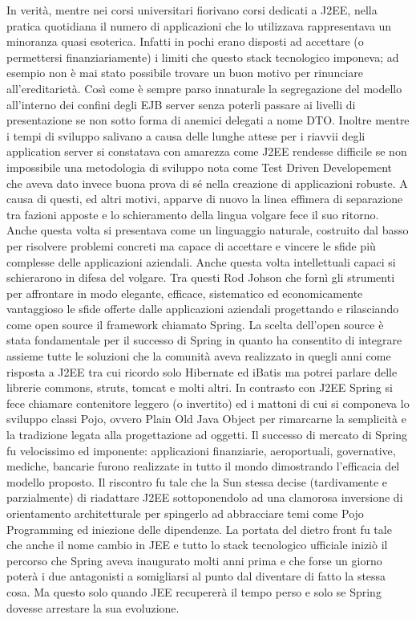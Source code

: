 In verità, mentre nei corsi universitari fiorivano corsi dedicati a J2EE,  nella pratica quotidiana il numero di applicazioni che lo utilizzava rappresentava un minoranza quasi esoterica. Infatti in pochi erano disposti ad accettare (o permettersi finanziariamente) i limiti che questo stack tecnologico imponeva; ad esempio non è mai stato possibile trovare un buon motivo per rinunciare all'ereditarietà. Così come è sempre parso innaturale la segregazione del modello all'interno dei confini degli EJB server senza poterli passare ai livelli di presentazione se non sotto forma di anemici delegati a nome DTO. Inoltre mentre i tempi di sviluppo salivano a causa delle lunghe attese per i riavvii degli application server si constatava con amarezza come J2EE rendesse difficile se non impossibile una metodologia di sviluppo nota come Test Driven Developement che aveva dato invece buona prova di sé nella creazione di applicazioni robuste.
A causa di questi, ed altri motivi, apparve di nuovo la linea effimera di separazione tra fazioni apposte e lo schieramento della lingua volgare fece il suo ritorno. Anche questa volta si presentava come un linguaggio naturale, costruito dal basso per risolvere problemi concreti ma capace di accettare e vincere le sfide più complesse delle applicazioni aziendali. Anche questa volta intellettuali capaci si schierarono in difesa del volgare. Tra questi Rod Johson che fornì gli strumenti per affrontare in modo elegante, efficace, sistematico ed economicamente vantaggioso le sfide offerte dalle applicazioni aziendali progettando e rilasciando come open source il framework chiamato Spring. La scelta dell'open source è stata fondamentale per il successo di Spring in quanto ha consentito di integrare assieme tutte le soluzioni che la comunità aveva realizzato in quegli anni come risposta a J2EE tra cui ricordo solo Hibernate ed iBatis ma potrei parlare delle librerie commons, struts, tomcat e molti altri. In contrasto con J2EE Spring si fece chiamare contenitore leggero (o invertito) ed i mattoni di cui si componeva lo sviluppo classi Pojo, ovvero Plain Old Java Object per rimarcarne la semplicità e la tradizione legata alla progettazione ad oggetti.
Il successo di mercato di Spring fu velocissimo ed imponente: applicazioni finanziarie, aeroportuali, governative, mediche, bancarie furono realizzate in tutto il mondo dimostrando l'efficacia del modello proposto. Il riscontro fu tale che la Sun stessa decise (tardivamente e parzialmente) di riadattare J2EE sottoponendolo ad una clamorosa inversione di orientamento architetturale  per spingerlo ad abbracciare temi come Pojo Programming ed iniezione delle dipendenze. La portata del dietro front fu tale che anche il nome cambio in JEE e tutto lo stack tecnologico ufficiale iniziò il percorso che Spring aveva inaugurato molti anni prima e che forse un giorno poterà i due antagonisti a somigliarsi al punto dal diventare di fatto la stessa cosa. Ma questo solo quando JEE recupererà il tempo perso e solo se Spring dovesse arrestare la sua evoluzione.
